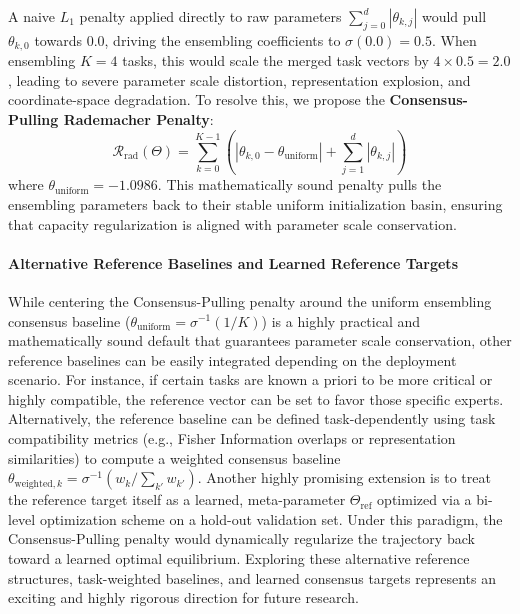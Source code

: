 A naive $L_1$ penalty applied directly to raw parameters $\sum_{j=0}^d |\theta_{k,j}|$ would pull $\theta_{k,0}$ towards $0.0$, driving the ensembling coefficients to $\sigma(0.0) = 0.5$. When ensembling $K=4$ tasks, this would scale the merged task vectors by $4 \times 0.5 = 2.0$, leading to severe parameter scale distortion, representation explosion, and coordinate-space degradation. To resolve this, we propose the \textbf{Consensus-Pulling Rademacher Penalty}:
\begin{equation}
\mathcal{R}_{\text{rad}}(\Theta) = \sum_{k=0}^{K-1} \left( \left| \theta_{k,0} - \theta_{\text{uniform}} \right| + \sum_{j=1}^d \left| \theta_{k,j} \right| \right)
\end{equation}
where $\theta_{\text{uniform}} = -1.0986$. This mathematically sound penalty pulls the ensembling parameters back to their stable uniform initialization basin, ensuring that capacity regularization is aligned with parameter scale conservation.

\paragraph{Alternative Reference Baselines and Learned Reference Targets}
While centering the Consensus-Pulling penalty around the uniform ensembling consensus baseline ($\theta_{\text{uniform}} = \sigma^{-1}(1/K)$) is a highly practical and mathematically sound default that guarantees parameter scale conservation, other reference baselines can be easily integrated depending on the deployment scenario. For instance, if certain tasks are known a priori to be more critical or highly compatible, the reference vector can be set to favor those specific experts. Alternatively, the reference baseline can be defined task-dependently using task compatibility metrics (e.g., Fisher Information overlaps or representation similarities) to compute a weighted consensus baseline $\theta_{\text{weighted}, k} = \sigma^{-1}(w_k / \sum_{k'} w_{k'})$. Another highly promising extension is to treat the reference target itself as a learned, meta-parameter $\Theta_{\text{ref}}$ optimized via a bi-level optimization scheme on a hold-out validation set. Under this paradigm, the Consensus-Pulling penalty would dynamically regularize the trajectory back toward a learned optimal equilibrium. Exploring these alternative reference structures, task-weighted baselines, and learned consensus targets represents an exciting and highly rigorous direction for future research.

